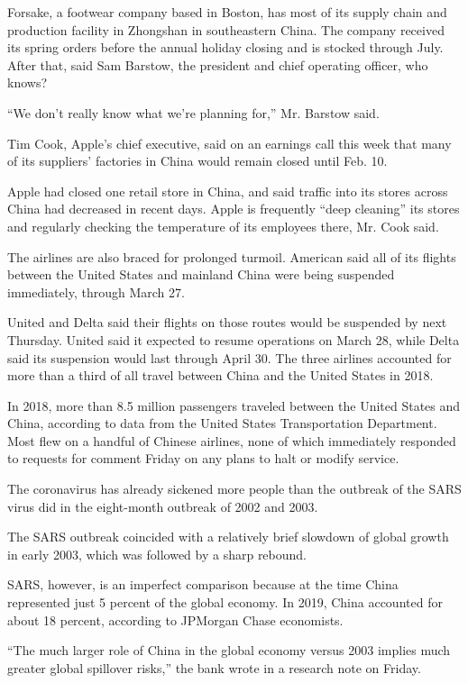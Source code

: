 Forsake, a footwear company based in Boston, has most of its supply
chain and production facility in Zhongshan in southeastern China. The
company received its spring orders before the annual holiday closing and
is stocked through July. After that, said Sam Barstow, the president and
chief operating officer, who knows?

``We don't really know what we're planning for,'' Mr. Barstow said.

Tim Cook, Apple's chief executive, said on an earnings call this week
that many of its suppliers' factories in China would remain closed until
Feb. 10.

Apple had closed one retail store in China, and said traffic into its
stores across China had decreased in recent days. Apple is frequently
``deep cleaning'' its stores and regularly checking the temperature of
its employees there, Mr. Cook said.

The airlines are also braced for prolonged turmoil. American said all of
its flights between the United States and mainland China were being
suspended immediately, through March 27.

United and Delta said their flights on those routes would be suspended
by next Thursday. United said it expected to resume operations on March
28, while Delta said its suspension would last through April 30. The
three airlines accounted for more than a third of all travel between
China and the United States in 2018.

In 2018, more than 8.5 million passengers traveled between the United
States and China, according to data from the United States
Transportation Department. Most flew on a handful of Chinese airlines,
none of which immediately responded to requests for comment Friday on
any plans to halt or modify service.

The coronavirus has already sickened more people than the outbreak of
the SARS virus did in the eight-month outbreak of 2002 and 2003.

The SARS outbreak coincided with a relatively brief slowdown of global
growth in early 2003, which was followed by a sharp rebound.

SARS, however, is an imperfect comparison because at the time China
represented just 5 percent of the global economy. In 2019, China
accounted for about 18 percent, according to JPMorgan Chase economists.

``The much larger role of China in the global economy versus 2003
implies much greater global spillover risks,'' the bank wrote in a
research note on Friday.

